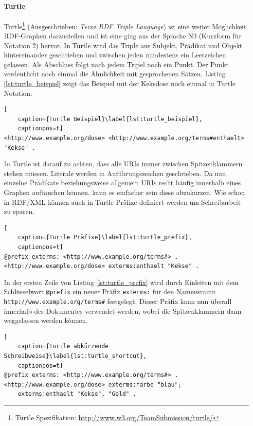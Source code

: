 \paragraph{Turtle} %
\label{par:turtle}

Turtle\footnote{Turtle Spezifikation: \url{http://www.w3.org/TeamSubmission/turtle/}} (Ausgeschrieben: \emph{Terse RDF Triple Language}) ist eine weiter Möglichkeit RDF-Graphen darzustellen und ist eine ging aus der Sprache N3 (Kurzform für Notation 2) hervor. In Turtle wird das Triple aus Subjekt, Prädikat und Objekt hintereinander geschrieben und zwischen jeden mindestens ein Leerzeichen gelassen. Als Abschluss folgt nach jedem Tripel noch ein Punkt. Der Punkt verdeutlicht noch einmal die Ähnlichkeit mit gesprochenen Sätzen. Listing \ref{lst:turtle_beispiel} zeigt das Beispiel mit der Keksdose noch einmal in Turtle Notation. 

\begin{lstlisting}[
    caption={Turtle Beispiel}\label{lst:turtle_beispiel},
    captionpos=t]
<http://www.example.org/dose> <http://www.example.org/terms#enthaelt> "Kekse" .
\end{lstlisting} 

In Turtle ist darauf zu achten, dass alle URIs immer zwischen Spitzenklammern stehen müssen. Literale werden in Anführungszeichen geschrieben. Da nun einzelne Prädikate beziehungsweise allgemein URIs recht häufig innerhalb eines Graphen auftauchen können, kann es einfacher sein diese abzukürzen. Wie schon in RDF/XML können auch in Turtle Präfixe definiert werden um Schreibarbeit zu sparen.

\begin{lstlisting}[
    caption={Turtle Präfixe}\label{lst:turtle_prefix},
    captionpos=t]
@prefix exterms: <http://www.example.org/terms#> .
<http://www.example.org/dose> exterms:enthaelt "Kekse" .   
\end{lstlisting}

In der ersten Zeile von Listing \ref{lst:turtle_prefix} wird durch Einleiten mit dem Schlüsselwort \texttt{@prefix} ein neuer Präfix \texttt{exterms:} für den Namensraum \texttt{http://www.example.org/terms\#} festgelegt. Dieser Präfix kann nun überall innerhalb des Dokumentes verwendet werden, wobei die Spitzenklammern dann weggelassen werden können.

\begin{lstlisting}[
    caption={Turtle abkürzende Schreibweise}\label{lst:turtle_shortcut},
    captionpos=t]
@prefix exterms: <http://www.example.org/terms#> .
<http://www.example.org/dose> exterms:farbe "blau";
    exterms:enthaelt "Kekse", "Geld" .   
\end{lstlisting}

